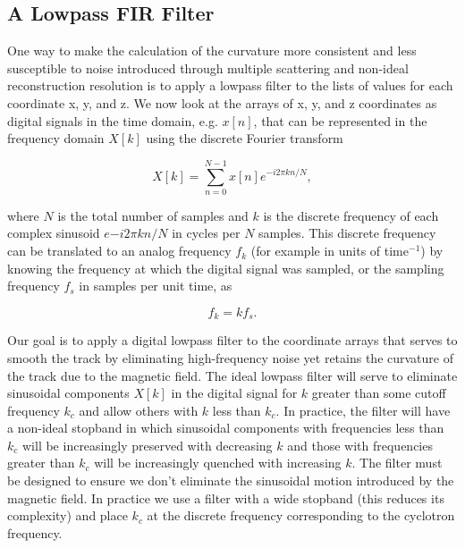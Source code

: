 \documentclass{JINST}
\begin{document}
\subsection{A Lowpass FIR Filter}\label{ssec:FIR}
One way to make the calculation of the curvature more consistent and less susceptible to noise introduced through 
multiple scattering and non-ideal reconstruction resolution is to apply a lowpass filter to the lists of values for each 
coordinate x, y, and z.  We now look at the arrays of x, y, and z coordinates as digital signals in the time
domain, e.g. $x[n]$, that can be represented in the frequency domain $X[k]$ using the discrete Fourier transform

\begin{equation}
X[k] = \sum_{n=0}^{N-1}x[n]e^{-i2\pi kn/N},
\end{equation}

\noindent where $N$ is the total number of samples and $k$ is the discrete frequency of each complex
sinusoid $e{-i2\pi kn/N}$ in cycles per $N$ samples.  This discrete frequency can be translated to an analog
frequency $f_{k}$ (for example in units of time$^{-1}$) by knowing the frequency at which the digital signal was
sampled, or the sampling frequency $f_{s}$ in samples per unit time, as

\begin{equation}
f_{k} = kf_{s}.
\end{equation}

Our goal is to apply a digital lowpass filter to the coordinate arrays that serves to
smooth the track by eliminating high-frequency noise yet retains the curvature of the track
due to the magnetic field.  The ideal lowpass filter will serve to eliminate sinusoidal components
$X[k]$ in the digital signal for $k$ greater than some cutoff frequency $k_{c}$ and allow 
others with $k$ less than $k_{c}$.  In practice, the filter will have a non-ideal stopband in which sinusoidal 
components with frequencies less than $k_{c}$ will be increasingly preserved with decreasing $k$ and those 
with frequencies greater than $k_{c}$ will be increasingly quenched with increasing $k$.  The filter must be designed 
to ensure we don't eliminate the sinusoidal motion introduced by the magnetic field.  In practice we use a
filter with a wide stopband (this reduces its complexity) and place $k_{c}$ at the discrete frequency corresponding
to the cyclotron frequency.

\end{document}
